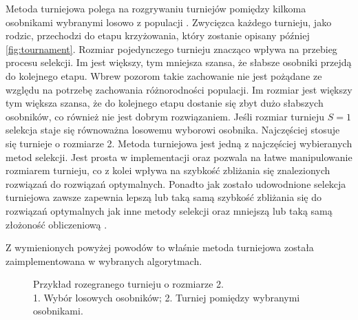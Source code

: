 \documentclass[twoside]{iisthesis}
\begin{document}
Metoda turniejowa polega na rozgrywaniu turniejów pomiędzy kilkoma osobnikami wybranymi losowo z populacji \cite{tournament}. Zwycięzca każdego turnieju, jako rodzic, przechodzi do etapu krzyżowania, który zostanie opisany później \eqref{fig:tournament}. Rozmiar pojedynczego turnieju znacząco wpływa na przebieg procesu selekcji. Im jest większy, tym mniejsza szansa, że słabsze osobniki przejdą do kolejnego etapu. Wbrew pozorom takie zachowanie nie jest pożądane ze względu na potrzebę zachowania różnorodności populacji. Im rozmiar jest większy tym większa szansa, że do kolejnego etapu dostanie się zbyt dużo słabszych osobników, co również nie jest dobrym rozwiązaniem. Jeśli rozmiar turnieju $S = 1$ selekcja staje się równoważna losowemu wyborowi osobnika. Najczęściej stosuje się turnieje o rozmiarze 2. Metoda turniejowa jest jedną z najczęściej wybieranych metod selekcji. Jest prosta w implementacji oraz pozwala na łatwe manipulowanie rozmiarem turnieju, co z kolei wpływa na szybkość zbliżania się znalezionych rozwiązań do rozwiązań optymalnych. Ponadto jak zostało udowodnione selekcja turniejowa zawsze zapewnia lepszą lub taką samą szybkość zbliżania się do rozwiązań optymalnych jak inne metody selekcji oraz mniejszą lub taką samą złożoność obliczeniową \cite{book}.

Z wymienionych powyżej powodów to właśnie metoda turniejowa została zaimplementowana w wybranych algorytmach.
\begin{figure}[!htb]
	\centering
	\caption{Przykład rozegranego turnieju o rozmiarze 2.\\1. Wybór losowych osobników; 2. Turniej pomiędzy wybranymi osobnikami.}
	\label{fig:tournament}
\end{figure}
\end{document}
